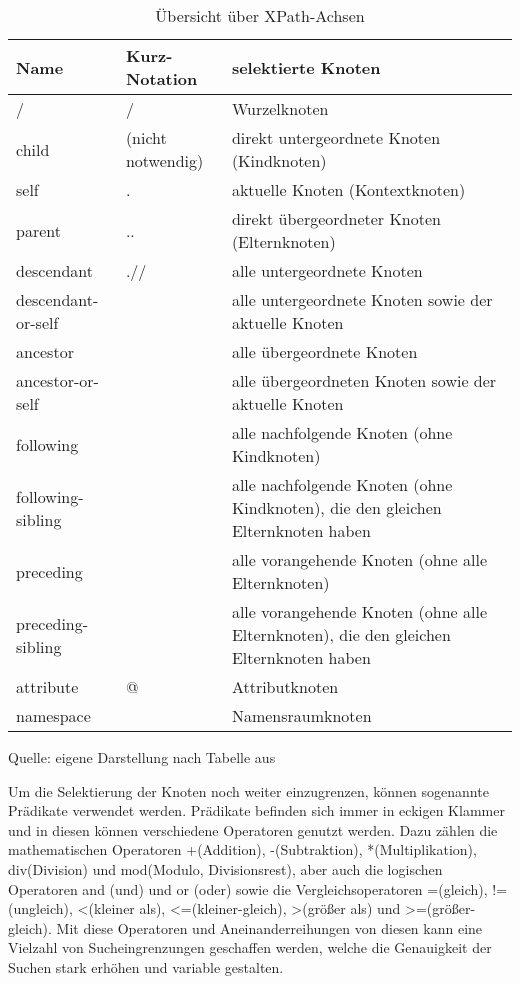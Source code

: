 \begin{table}[H]
    \centering
    \begin{tabular}{|l|l|p{8cm}|} %
        \hline
        \textbf{Name} & \textbf{Kurz-Notation} & \textbf{selektierte Knoten} \\
        \hline
        / & / & Wurzelknoten \\
        \hline
        child & (nicht notwendig) & direkt untergeordnete Knoten (Kindknoten) \\
        \hline
        self & . & aktuelle Knoten (Kontextknoten) \\
        \hline
        parent & .. & direkt übergeordneter Knoten (Elternknoten) \\
        \hline
        descendant & .// & alle untergeordnete Knoten \\
        \hline
        descendant-or-self &  & alle untergeordnete Knoten sowie der aktuelle Knoten \\
        \hline
        ancestor &  & alle übergeordnete Knoten \\
        \hline
        ancestor-or-self &  & alle übergeordneten Knoten sowie der aktuelle Knoten \\
        \hline
        following &  & alle nachfolgende Knoten (ohne Kindknoten) \\
        \hline
        following-sibling &  & alle nachfolgende Knoten (ohne Kindknoten), die den gleichen Elternknoten haben \\
        \hline
        preceding &  & alle vorangehende Knoten (ohne alle Elternknoten) \\
        \hline
        preceding-sibling &  & alle vorangehende Knoten (ohne alle Elternknoten), die den gleichen Elternknoten haben \\
        \hline
        attribute & @ & Attributknoten \\
        \hline
        namespace &  & Namensraumknoten \\
        \hline
    \end{tabular}
    \caption{Übersicht über XPath-Achsen}
    \label{tab:Übersicht über XPath-Achsen}
    \vspace{0.2cm}
    {\small Quelle: eigene Darstellung nach Tabelle aus \cite*{XPath2025}}
\end{table}

Um die Selektierung der Knoten noch weiter einzugrenzen, können sogenannte Prädikate verwendet werden.
Prädikate befinden sich immer in eckigen Klammer und in diesen können verschiedene Operatoren genutzt werden.
Dazu zählen die mathematischen Operatoren +(Addition), -(Subtraktion), *(Multiplikation), div(Division) und mod(Modulo, Divisionsrest),
aber auch die logischen Operatoren and (und) und or (oder) sowie die Vergleichsoperatoren =(gleich), !=(ungleich),
<(kleiner als), <=(kleiner-gleich), >(größer als) und >=(größer-gleich).
Mit diese Operatoren und Aneinanderreihungen von diesen kann eine Vielzahl von Sucheingrenzungen geschaffen werden,
welche die Genauigkeit der Suchen stark erhöhen und variable gestalten. \cite*{XPath2025}


